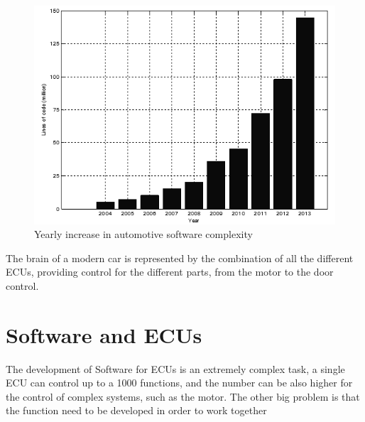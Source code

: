 \documentclass[../main.tex]{subfiles}
\begin{document}
\begin{figure}[H]
    \centering
    \includegraphics[width=\linewidth]{images_folder/Yearly-increase-in-automotive-software-complexity-shown-by-million-lines-of-code-of-1-ConvertImage.png}
    \caption{Yearly increase in automotive software complexity}
    \label{fig:yearlyincreas}
\end{figure}
The brain of a modern car is represented by the combination of all the different ECUs, providing control for the different parts, from the motor to the door control. 
\section{Software and ECUs}
The development of Software for ECUs is an extremely complex task, a single ECU can control up to a 1000 functions, and the number can be also higher for the control of complex systems, such as the motor. The other big problem is that the function need to be developed in order to work together 
\cleardoublepage
\end{document}
